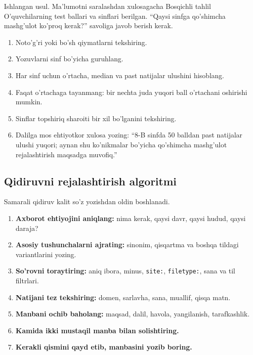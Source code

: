 \documentclass[11pt,a4paper,oneside]{book}
\newcommand{\code}[1]{\texttt{#1}}
\newcommand{\difficulty}[1]{\hfill\textcolor{Muted}{\scriptsize\sffamily #1}}
\begin{document}
\begin{examplebox}{Ishlangan usul. Ma'lumotni saralashdan xulosagacha \difficulty{Bosqichli tahlil}}
O'quvchilarning test ballari va sinflari berilgan. “Qaysi sinfga qo'shimcha mashg'ulot ko'proq kerak?” savoliga javob berish kerak.
\begin{solutionbox}
\begin{enumerate}
\item Noto'g'ri yoki bo'sh qiymatlarni tekshiring.
\item Yozuvlarni sinf bo'yicha guruhlang.
\item Har sinf uchun o'rtacha, median va past natijalar ulushini hisoblang.
\item Faqat o'rtachaga tayanmang: bir nechta juda yuqori ball o'rtachani oshirishi mumkin.
\item Sinflar topshiriq sharoiti bir xil bo'lganini tekshiring.
\item Dalilga mos ehtiyotkor xulosa yozing: “8-B sinfda 50 balldan past natijalar ulushi yuqori; aynan shu ko'nikmalar bo'yicha qo'shimcha mashg'ulot rejalashtirish maqsadga muvofiq.”
\end{enumerate}
\end{solutionbox}
\end{examplebox}
\subsection{Qidiruvni rejalashtirish algoritmi}
Samarali qidiruv kalit so'z yozishdan oldin boshlanadi.
\begin{enumerate}
\item \textbf{Axborot ehtiyojini aniqlang:} nima kerak, qaysi davr, qaysi hudud, qaysi daraja?
\item \textbf{Asosiy tushunchalarni ajrating:} sinonim, qisqartma va boshqa tildagi variantlarini yozing.
\item \textbf{So'rovni toraytiring:} aniq ibora, minus, \code{site:}, \code{filetype:}, sana va til filtrlari.
\item \textbf{Natijani tez tekshiring:} domen, sarlavha, sana, muallif, qisqa matn.
\item \textbf{Manbani ochib baholang:} maqsad, dalil, havola, yangilanish, tarafkashlik.
\item \textbf{Kamida ikki mustaqil manba bilan solishtiring.}
\item \textbf{Kerakli qismini qayd etib, manbasini yozib boring.}
\end{enumerate}
\end{document}
